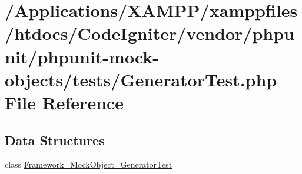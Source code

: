 \hypertarget{_generator_test_8php}{}\section{/\+Applications/\+X\+A\+M\+P\+P/xamppfiles/htdocs/\+Code\+Igniter/vendor/phpunit/phpunit-\/mock-\/objects/tests/\+Generator\+Test.php File Reference}
\label{_generator_test_8php}
\subsection*{Data Structures}
\begin{DoxyCompactItemize}
\item 
class \mbox{\hyperlink{class_framework___mock_object___generator_test}{Framework\+\_\+\+Mock\+Object\+\_\+\+Generator\+Test}}
\end{DoxyCompactItemize}
